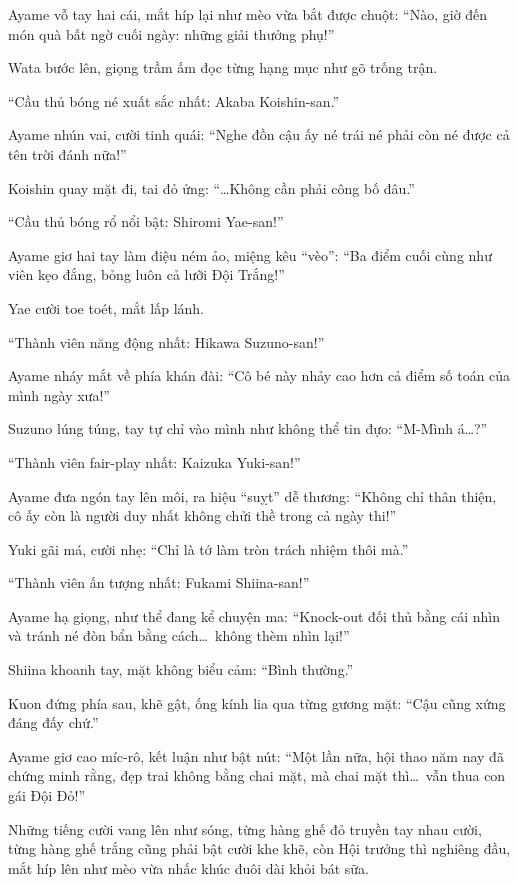 \documentclass[../main.tex]{subfiles}
\begin{document}
\ct

Ayame vỗ tay hai cái, mắt híp lại như mèo vừa bắt được chuột: ``Nào, giờ đến món quà bất ngờ cuối ngày: những giải thưởng phụ!''

Wata bước lên, giọng trầm ấm đọc từng hạng mục như gõ trống trận.

``Cầu thủ bóng né xuất sắc nhất: Akaba Koishin-san.''

Ayame nhún vai, cười tinh quái: ``Nghe đồn cậu ấy né trái né phải còn né được cả tên trời đánh nữa!''

Koishin quay mặt đi, tai đỏ ửng: ``\dots Không cần phải công bố đâu.''

``Cầu thủ bóng rổ nổi bật: Shiromi Yae-san!''

Ayame giơ hai tay làm điệu ném ảo, miệng kêu ``vèo'': ``Ba điểm cuối cùng như viên kẹo đắng, bỏng luôn cả lưỡi Đội Trắng!''

Yae cười toe toét, mắt lấp lánh.

``Thành viên năng động nhất: Hikawa Suzuno-san!''

Ayame nháy mắt về phía khán đài: ``Cô bé này nhảy cao hơn cả điểm số toán của mình ngày xưa!''

Suzuno lúng túng, tay tự chỉ vào mình như không thể tin đựo: ``M-Mình á\dots?''

``Thành viên fair-play nhất: Kaizuka Yuki-san!''

Ayame đưa ngón tay lên môi, ra hiệu ``suỵt'' dễ thương: ``Không chỉ thân thiện, cô ấy còn là người duy nhất không chửi thề trong cả ngày thi!''

Yuki gãi má, cười nhẹ: ``Chỉ là tớ làm tròn trách nhiệm thôi mà.''

``Thành viên ấn tượng nhất: Fukami Shiina-san!''

Ayame hạ giọng, như thể đang kể chuyện ma: ``Knock-out đối thủ bằng cái nhìn và tránh né đòn bẩn bằng cách\dots\ không thèm nhìn lại!''

Shiina khoanh tay, mặt không biểu cảm: ``Bình thường.''

Kuon đứng phía sau, khẽ gật, ống kính lia qua từng gương mặt: ``Cậu cũng xứng đáng đấy chứ.''

Ayame giơ cao míc-rô, kết luận như bật nút: ``Một lần nữa, hội thao năm nay đã chứng minh rằng, đẹp trai không bằng chai mặt, mà chai mặt thì\dots\ vẫn thua con gái Đội Đỏ!''

Những tiếng cười vang lên như sóng, từng hàng ghế đỏ truyền tay nhau cười, từng hàng ghế trắng cũng phải bật cười khe khẽ, còn Hội trưởng thì nghiêng đầu, mắt híp lên như mèo vừa nhấc khúc đuôi dài khỏi bát sữa.
\end{document}
